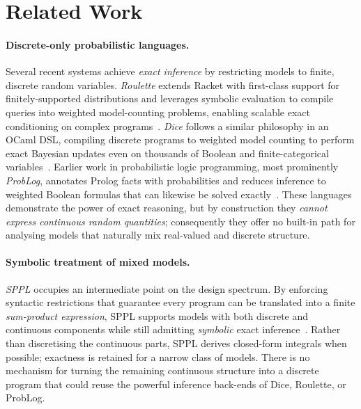 \section{Related Work}
\label{sec:related}

\paragraph{Discrete-only probabilistic languages.}  
Several recent systems achieve \emph{exact inference} by restricting models to finite, discrete random variables. \emph{Roulette} extends Racket with first-class support for finitely-supported distributions and leverages symbolic evaluation to compile queries into weighted model-counting problems, enabling scalable exact conditioning on complex programs~\cite{Moy2025Roulette}. \emph{Dice} follows a similar philosophy in an OCaml DSL, compiling discrete programs to weighted model counting to perform exact Bayesian updates even on thousands of Boolean and finite-categorical variables~\cite{Holtzen2020Dice}. Earlier work in probabilistic logic programming, most prominently \emph{ProbLog}, annotates Prolog facts with probabilities and reduces inference to weighted Boolean formulas that can likewise be solved exactly~\cite{DeRaedt2007ProbLog}. These languages demonstrate the power of exact reasoning, but by construction they \emph{cannot express continuous random quantities}; consequently they offer no built-in path for analysing models that naturally mix real-valued and discrete structure.  

\paragraph{Symbolic treatment of mixed models.}  
\emph{SPPL} occupies an intermediate point on the design spectrum. By enforcing syntactic restrictions that guarantee every program can be translated into a finite \emph{sum-product expression}, SPPL supports models with both discrete and continuous components while still admitting \emph{symbolic} exact inference~\cite{Saad2021SPPL}. Rather than discretising the continuous parts, SPPL derives closed-form integrals when possible; exactness is retained for a narrow class of models. There is no mechanism for turning the remaining continuous structure into a discrete program that could reuse the powerful inference back-ends of Dice, Roulette, or ProbLog.


